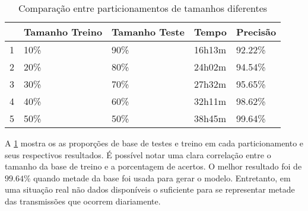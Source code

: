\begin{table}[h]
    \centering
    \caption{Comparação entre particionamentos de tamanhos diferentes}
    \label{tab:partic}
    \begin{tabular}{l|l|l|l|l|}
        \cline{2-5}
                                                        & \multicolumn{1}{c|}{\cellcolor[HTML]{EFEFEF}Tamanho Treino} & \multicolumn{1}{c|}{\cellcolor[HTML]{EFEFEF}Tamanho Teste} & \multicolumn{1}{c|}{\cellcolor[HTML]{EFEFEF}Tempo} & \multicolumn{1}{c|}{\cellcolor[HTML]{EFEFEF}Precisão} \\ \hline
        \multicolumn{1}{|l|}{\cellcolor[HTML]{EFEFEF}1} & 10\%                                                        & 90\%                                                       & 16h13m                                             & 92.22\%                                               \\ \hline
        \multicolumn{1}{|l|}{\cellcolor[HTML]{EFEFEF}2} & 20\%                                                        & 80\%                                                       & 24h02m                                             & 94.54\%                                               \\ \hline
        \multicolumn{1}{|l|}{\cellcolor[HTML]{EFEFEF}3} & 30\%                                                        & 70\%                                                       & 27h32m                                             & 95.65\%                                               \\ \hline
        \multicolumn{1}{|l|}{\cellcolor[HTML]{EFEFEF}4} & 40\%                                                        & 60\%                                                       & 32h11m                                             & 98.62\%                                               \\ \hline
        \multicolumn{1}{|l|}{\cellcolor[HTML]{EFEFEF}5} & 50\%                                                        & 50\%                                                       & 38h45m                                             & 99.64\%                                               \\ \hline
    \end{tabular}
\end{table}

\par A \ref{tab:partic} mostra os as proporções de base de testes e treino em cada particionamento e seus respectivos
resultados. É possível notar uma clara correlação entre o tamanho da base de treino e a porcentagem de acertos. O
melhor resultado foi de $99.64$\% quando metade da base foi usada para gerar o modelo. Entretanto, em uma situação real
não dados disponíveis o suficiente para se representar metade das transmissões que ocorrem diariamente.


